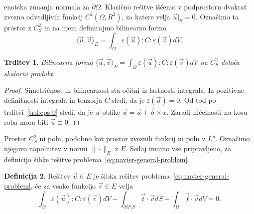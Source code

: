 \documentclass[12pt,a4paper,twoside]{article}
\theoremstyle{definition} %
\newtheorem{definicija}{Definicija}[section]
\theoremstyle{plain} %
\newtheorem{trditev}[definicija]{Trditev}
\numberwithin{equation}{section}
\newcommand{\eps}{\varepsilon}
\newcommand{\vv}{\vec{v}}
\newcommand{\vt}{\vec{t}}
\newcommand{\vu}{\vec{u}}
\newcommand{\va}{\vec{a}}
\newcommand{\vb}{\vec{b}}
\newcommand{\vf}{\vec{f}}
\newcommand{\vx}{x}
\begin{document}
enotska zunanja normala za $\partial\Omega$.
Klasično rešitve iščemo v podprostoru dvakrat zvezno odvedljivih funkcij
$C^2(\Omega, R^3)$, za katere velja $\vu|_S = 0$. Označimo ta prostor z $C^2_S$
in na njem definirajmo bilinearno formo \[
  \langle \vu, \vv \rangle_E =  \int_{\Omega} \eps(\vu) : C : \eps(\vv) dV.
\]
\begin{trditev}
  Bilinearna forma $
  \langle \vu, \vv \rangle_E =  \int_{\Omega} \eps(\vu) : C : \eps(\vv) dV$ na
  $C^2_S$ določa skalarni produkt.
\end{trditev}
\begin{proof}
Simetričnost in bilinearnost sta očitni iz lastnosti integrala. Iz pozitivne
definitnosti integrala in tenzorja $C$ sledi, da je $\eps(\vu) = 0$. Od tod po
trditvi~\ref{trd:eps-0} sledi, da je $\vu$ oblike $\vu = \va + \vb \times \vx$.
Zaradi ničelnosti na kosu roba mora biti $\vu \equiv 0$.
\end{proof}
Prostor $C^2_S$ ni poln, podobno kot prostor zveznih funkcij ni poln v $L^p$.
Označimo njegovo napolnitev v normi $\|\cdot\|_E$ z $E$. Sedaj imamo vse
pripravljeno, za definicijo šibke rešitve
problema~\ref{eq:navier-general-problem}.

\begin{definicija}
  \label{def:sibka}
  Rešitev $\vu \in E$ je šibka rešitev problema~\ref{eq:navier-general-problem},
  če za vsako funkcijo $\vv \in E$ velja \[
    \int_{\Omega}\eps(\vu) : C : \eps(\vv) dV - \int_{\partial \Omega\setminus S} \vt\cdot \vv dS -
\int_{\Omega} \vf\cdot \vv dV = 0. \]
\end{definicija}
\end{document}
